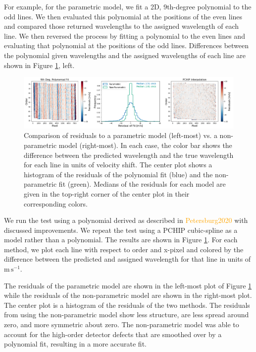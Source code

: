 \documentclass[twocolumn]{aastex63}
\newcommand{\lz}[1]{\textcolor{orange}{#1}}
\newcommand{\mps}{\mathrm{m\,s^{-1}}}
\begin{document}
For example, for the parametric model, we fit a 2D, 9th-degree polynomial to the odd lines.  We then evaluated this polynomial at the positions of the even lines and compared those returned wavelengths to the assigned wavelength of each line.  We then reversed the process by fitting a polynomial to the even lines and evaluating that polynomial at the positions of the odd lines.  Differences between the polynomial given wavelengths and the assigned wavelengths of each line are shown in Figure \ref{fig:parametricTest}, left.

\begin{figure}[h]
\centering
\includegraphics[width=\textwidth]{Figures/parametricTest.png}
\caption{Comparison of residuals to a parametric model (left-most) vs. a non-parametric model (right-most).  In each case, the color bar shows the difference between the predicted wavelength and the true wavelength for each line in units of velocity shift.  The center plot shows a histogram of the residuals of the polynomial fit (blue) and the non-parametric fit (green).  Medians of the residuals for each model are given in the top-right corner of the center plot in their corresponding colors.}
\label{fig:parametricTest}
\end{figure}

We run the test using a polynomial derived as described in \lz{Petersburg2020} with discussed improvements.  We repeat the test using a PCHIP cubic-spline as a model rather than a polynomial.  The results are shown in Figure \ref{fig:parametricTest}.  For each method, we plot each line with respect to order and x-pixel and colored by the difference between the predicted and assigned wavelength for that line in units of $\mps$.

The residuals of the parametric model are shown in the left-most plot of Figure \ref{fig:parametricTest} while the residuals of the non-parametric model are shown in the right-most plot.  The center plot is a histogram of the residuals of the two methods.  The residuals from using the non-parametric model show less structure, are less spread around zero, and more symmetric about zero.  The non-parametric model was able to account for the high-order detector defects that are smoothed over by a polynomial fit, resulting in a more accurate fit.
\end{document}

